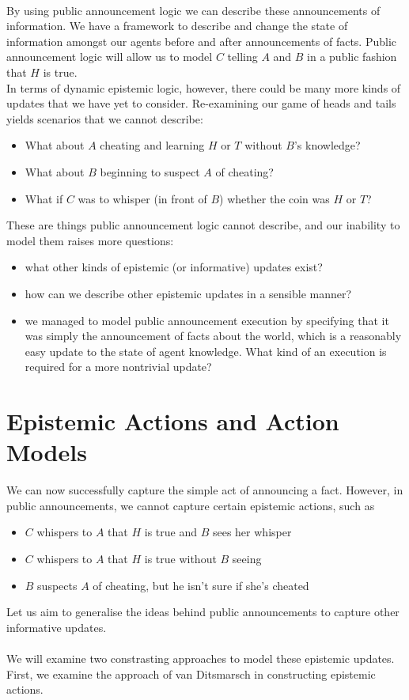 \documentclass[12pt, a4paper, twoside]{article}
\begin{document}
\\
By using public announcement logic we can describe these announcements of
information.
We have a framework to describe and change the state of information amongst our
agents before and after announcements of facts.
Public announcement logic will allow us to model $C$ telling $A$ and $B$ in a
public fashion that $H$ is true.
\\
In terms of dynamic epistemic logic, however, there could be many more kinds of
updates that we have yet to consider.
Re-examining our game of heads and tails yields scenarios that we cannot
describe:
\begin{itemize}
	\item What about $A$ cheating and learning $H$ or $T$ without $B$'s knowledge?
	\item What about $B$ beginning to suspect $A$ of cheating?
	\item What if $C$ was to whisper (in front of $B$) whether the coin was $H$
	or $T$?
\end{itemize}
These are things public announcement logic cannot describe, and our inability to
model them raises more questions:
\begin{itemize}
	\item what other kinds of epistemic (or informative) updates exist?
	\item how can we describe other epistemic updates in a sensible manner?
	\item we managed to model public announcement execution by specifying that it
	was simply the announcement of facts about the world, which is a reasonably
	easy update to the state of agent knowledge. What kind of an execution is
	required for a more nontrivial update?
\end{itemize}

\section{Epistemic Actions and Action Models} \label{estAct}
We can now successfully capture the simple act of announcing a fact.
However, in public announcements, we cannot capture certain epistemic actions,
such as
\begin{itemize} 
  \item $C$ whispers to $A$ that $H$ is true and $B$ sees her whisper
  \item $C$ whispers to $A$ that $H$ is true without $B$ seeing
  \item $B$ suspects $A$ of cheating, but he isn't sure if she's cheated
\end{itemize}
Let us aim to generalise the ideas behind public announcements to capture other
informative updates.\\
\\
We will examine two constrasting approaches to model these epistemic updates.
First, we examine the approach of van Ditsmarsch in constructing epistemic
actions.
\end{document}
